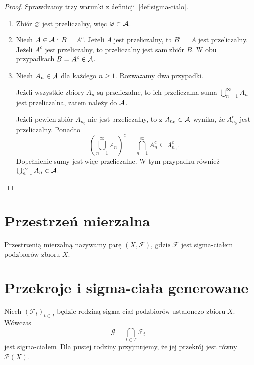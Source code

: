 \begin{proof}
Sprawdzamy trzy warunki z definicji~\ref{def:sigma-cialo}.
\begin{enumerate}
  \item Zbiór $\varnothing$ jest przeliczalny, więc $\varnothing\in\mathcal{A}$.
  \item Niech $A\in\mathcal{A}$ i $B=A^c$. Jeżeli $A$ jest przeliczalny,
  to $B^c=A$ jest przeliczalny. Jeżeli $A^c$ jest przeliczalny,
  to przeliczalny jest sam zbiór $B$. W obu przypadkach $B=A^c\in\mathcal{A}$.
  \item Niech $A_n\in\mathcal{A}$ dla każdego $n\geq1$. Rozważamy dwa przypadki.

  Jeżeli wszystkie zbiory $A_n$ są przeliczalne, to ich przeliczalna suma
  $\bigcup_{n=1}^{\infty}A_n$ jest przeliczalna, zatem należy do $\mathcal{A}$.

  Jeżeli pewien zbiór $A_{n_0}$ nie jest przeliczalny, to z $A_{n_0}\in\mathcal{A}$
  wynika, że $A_{n_0}^c$ jest przeliczalny. Ponadto
  \begin{equation}
    \left(\bigcup_{n=1}^{\infty}A_n\right)^c
    =\bigcap_{n=1}^{\infty}A_n^c\subseteq A_{n_0}^c.
    \label{eq:dopelnienie-sumy-przeliczalne}
  \end{equation}
  Dopełnienie sumy jest więc przeliczalne. W tym przypadku również
  $\bigcup_{n=1}^{\infty}A_n\in\mathcal{A}$.
\end{enumerate}
\end{proof}

\section{Przestrzeń mierzalna}
\label{sec:przestrzen-mierzalna}

\begin{definicja}
Przestrzenią mierzalną nazywamy parę $(X,\mathcal{F})$, gdzie
$\mathcal{F}$ jest sigma-ciałem podzbiorów zbioru $X$.
\end{definicja}

\section{Przekroje i sigma-ciała generowane}
\label{sec:sigma-ciala-generowane}

\begin{twierdzenie}
Niech $(\mathcal{F}_t)_{t\in T}$ będzie rodziną sigma-ciał podzbiorów
ustalonego zbioru $X$. Wówczas
\begin{equation}
  \mathcal{G}=\bigcap_{t\in T}\mathcal{F}_t
  \label{eq:przekroj-sigma-cial}
\end{equation}
jest sigma-ciałem. Dla pustej rodziny przyjmujemy, że jej przekrój
jest równy $\mathcal{P}(X)$.
\label{tw:przekroj-sigma-cial}
\end{twierdzenie}

